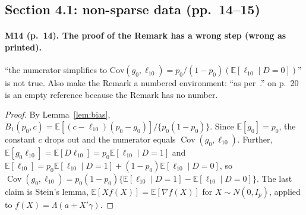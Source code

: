 \documentclass[11pt]{article}
\providecommand{\E}{\mathbb{E}}
\newenvironment{ins}{\begin{leftbar}}{\end{leftbar}}
\theoremstyle{plain}
\theoremstyle{remark}
\begin{document}
\subsection{Section 4.1: non-sparse data (pp.~14--15)}

\paragraph{M14 (p.~14). The proof of the Remark has a wrong step (wrong as printed).}
``the numerator simplifies to
$\mathrm{Cov}(g_0,\ell_{10})=p_0/(1-p_0)(\E[\ell_{10}\mid D=0])$'' is not true.
Also make the Remark a numbered environment: ``as per~.'' on p.~20 is an empty
reference because the Remark has no number.
\begin{ins}
\begin{proof}
By Lemma~\ref{lem:bias},
$B_1(p_0,c)=\E[(c-\ell_{10})(p_0-g_0)]/\{p_0(1-p_0)\}$. Since $\E[g_0]=p_0$, the
constant $c$ drops out and the numerator equals
$\operatorname{Cov}(g_0,\ell_{10})$. Further,
$\E[g_0\ell_{10}]=\E[D\ell_{10}]=p_0\E[\ell_{10}\mid D=1]$ and
$\E[\ell_{10}]=p_0\E[\ell_{10}\mid D=1]+(1-p_0)\E[\ell_{10}\mid D=0]$, so
$\operatorname{Cov}(g_0,\ell_{10})=p_0(1-p_0)\{\E[\ell_{10}\mid D=1]-\E[\ell_{10}\mid D=0]\}$.
The last claim is Stein's lemma, $\E[Xf(X)]=\E[\nabla f(X)]$ for
$X\sim N(0,I_p)$, applied to $f(X)=\Lambda(a+X'\gamma)$.
\end{proof}
\end{ins}
\end{document}
